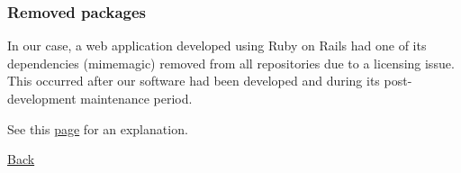 \documentclass[11pt,aspectratio=43,ignorenonframetext,t]{beamer}
\begin{document}
\begin{frame}

\frametitle{Removed packages}

In our case, a web application developed using Ruby on Rails had one of its dependencies (mimemagic) removed from all repositories due to a licensing issue.  This occurred after our software had been developed and during its post-development maintenance period.
\vs

See this \href{https://dev.to/cseeman/what-s-up-with-mimemagic-breaking-everything-he1}{page} for an explanation.
\vspace{3cm}

{\hfill}{\hyperlink{slide:dependencies}{Back}}

\end{frame}


\end{document}
